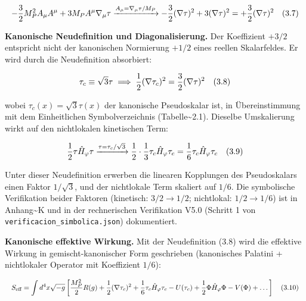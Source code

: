 ﻿\documentclass[11pt,letterpaper]{article}
\begin{document}
\begin{equation*}
  \resizebox{\ifdim\width>\linewidth \linewidth\else\width\fi}{!}{$\displaystyle -\frac{3}{2}M_P^2 A_\mu A^\mu + 3M_P A^\mu\nabla_\mu\tau \xrightarrow{A_\mu = \nabla_\mu\tau/M_P} -\frac{3}{2}(\nabla\tau)^2 + 3(\nabla\tau)^2 = +\frac{3}{2}(\nabla\tau)^2 \quad (3.7)$}
\end{equation*}

\textbf{Kanonische Neudefinition und Diagonalisierung.} Der Koeffizient $+3/2$ entspricht nicht der kanonischen Normierung $+1/2$ eines reellen Skalarfeldes. Er wird durch die Neudefinition absorbiert:

\begin{equation*}
  \resizebox{\ifdim\width>\linewidth \linewidth\else\width\fi}{!}{$\displaystyle \tau_c \equiv \sqrt{3}\tau \implies \frac{1}{2}(\nabla\tau_c)^2 = \frac{3}{2}(\nabla\tau)^2 \quad (3.8)$}
\end{equation*}

wobei $\tau_c(x) = \sqrt{3}\tau(x)$ der kanonische Pseudoskalar ist, in Übereinstimmung mit dem Einheitlichen Symbolverzeichnis (Tabelle\textasciitilde{}2.1). Dieselbe Umskalierung wirkt auf den nichtlokalen kinetischen Term:

\begin{equation*}
  \resizebox{\ifdim\width>\linewidth \linewidth\else\width\fi}{!}{$\displaystyle \frac{1}{2}\tau\hat{H}_\varphi\tau \xrightarrow{\tau = \tau_c/\sqrt{3}} \frac{1}{2}\cdot\frac{1}{3}\tau_c\hat{H}_\varphi\tau_c = \frac{1}{6}\tau_c\hat{H}_\varphi\tau_c \quad (3.9)$}
\end{equation*}

Unter dieser Neudefinition erwerben die linearen Kopplungen des Pseudoskalars einen Faktor $1/\sqrt{3}$, und der nichtlokale Term skaliert auf $1/6$. Die symbolische Verifikation beider Faktoren (kinetisch: $3/2 \to 1/2$; nichtlokal: $1/2 \to 1/6$) ist in Anhang\textasciitilde{}K und in der rechnerischen Verifikation V5.0 (Schritt 1 von \texttt{verificacion\_simbolica.json}) dokumentiert.

\textbf{Kanonische effektive Wirkung.} Mit der Neudefinition (3.8) wird die effektive Wirkung in gemischt-kanonischer Form geschrieben (kanonisches Palatini + nichtlokaler Operator mit Koeffizient $1/6$):

\begin{equation*}
  \resizebox{\ifdim\width>\linewidth \linewidth\else\width\fi}{!}{$\displaystyle S_{\text{eff}} = \int d^4x\sqrt{-g}\left[\frac{M_P^2}{2}R(g) + \frac{1}{2}(\nabla\tau_c)^2 + \frac{1}{6}\tau_c\hat{H}_\varphi\tau_c - U(\tau_c) + \frac{1}{2}\Phi\hat{H}_\varphi\Phi - V(\Phi) + \dots\right] \quad (3.10)$}
\end{equation*}
\end{document}
